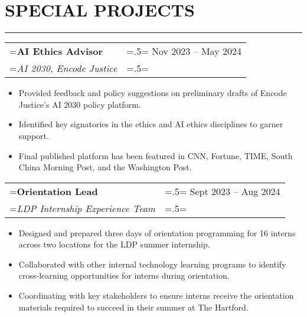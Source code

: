 \documentclass{article}
\begin{document}
\section*{\normalsize{SPECIAL PROJECTS}}
\vspace{-1.8em}
\noindent\rule{\textwidth}{.5pt}

\vspace{.5em}

\hspace{-1em}
\begin{tabularx}{\textwidth}{
    >{\raggedright\arraybackslash\hsize=1.5\hsize\linewidth=\hsize}X
    >{\raggedleft\arraybackslash\hsize=.5\hsize\linewidth=\hsize}X }
    \textbf{AI Ethics Advisor} & Nov 2023 -- May 2024\\
    \textit{AI 2030, Encode Justice} & \\
\end{tabularx}
\vspace{-.5em}
\begin{itemize}[label={--}, leftmargin=1em]
    \setlength\itemsep{0em}
    \item Provided feedback and policy suggestions on preliminary drafts of Encode Justice's AI 2030 policy platform.
    \item Identified key signatories in the ethics and AI ethics disciplines to garner support.
    \item Final published platform has been featured in CNN, Fortune, TIME, South China Morning Post, and the Washington Post.
\end{itemize}


\hspace{-1em}
\begin{tabularx}{\textwidth}{
    >{\raggedright\arraybackslash\hsize=1.5\hsize\linewidth=\hsize}X
    >{\raggedleft\arraybackslash\hsize=.5\hsize\linewidth=\hsize}X }
    \textbf{Orientation Lead} & Sept 2023 -- Aug 2024\\
    \textit{LDP Internship Experience Team} & \\
\end{tabularx}
\vspace{-.5em}
\begin{itemize}[label={--}, leftmargin=1em]
    \setlength\itemsep{0em}
    \item Designed and prepared three days of orientation programming for 16 interns across two locations for the LDP summer internship.
    \item Collaborated with other internal technology learning programs to identify cross-learning opportunities for interns during orientation.
    \item Coordinating with key stakeholders to ensure interns receive the orientation materials required to succeed in their summer at The Hartford.
\end{itemize}
\end{document}
